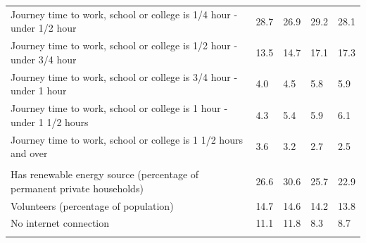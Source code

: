 \documentclass{article}
\begin{document}
\begin{table}[h]
\begin{tabular}{KTTTT}
Journey time to work, school or college is 1/4 hour - under 1/2 hour & 28.7& 26.9& 29.2& 28.1\\
Journey time to work, school or college is 1/2 hour - under 3/4 hour & 13.5& 14.7& 17.1& 17.3\\
Journey time to work, school or college is 3/4 hour - under 1 hour & 4.0& 4.5& 5.8& 5.9\\
Journey time to work, school or college is 1 hour - under 1 1/2 hours & 4.3& 5.4& 5.9& 6.1\\
Journey time to work, school or college is 1 1/2 hours and over & 3.6& 3.2& 2.7& 2.5\\
\hline
    \\ 
    \hline
Has renewable energy source (percentage of permanent private households) & 26.6& 30.6& 25.7& 22.9\\
    \hline
Volunteers (percentage of population) & 14.7& 14.6& 14.2& 13.8\\
    \hline
No internet connection& 11.1& 11.8&  8.3&  8.7\\
\hline
\end{tabular}
\end{table}
\end{document}
